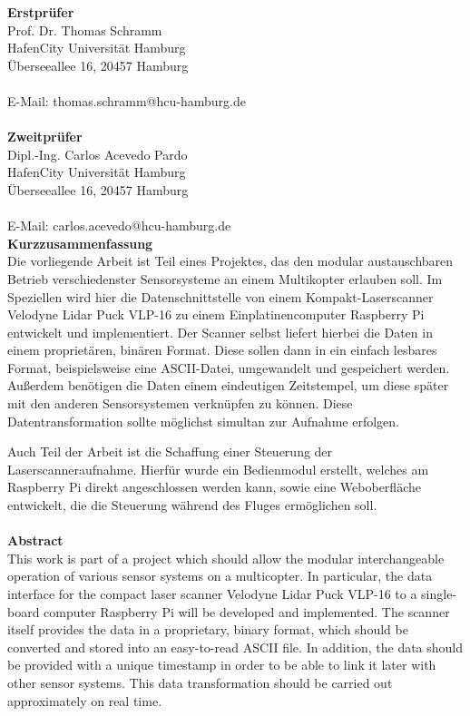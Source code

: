 \documentclass[a4paper,12pt,bibliography=totoc, listof=totoc,titlepage,pointlessnumbers]{scrreprt}
\begin{document}
\noindent\textbf{\large Erstprüfer}\\
Prof. Dr. Thomas Schramm\\
HafenCity Universität Hamburg\\
Überseeallee 16, 20457 Hamburg\\
\\
E-Mail: thomas.schramm@hcu-hamburg.de\\
\vspace{3cm}\\
\textbf{\large Zweitprüfer}\\
Dipl.-Ing. Carlos Acevedo Pardo\\
HafenCity Universität Hamburg\\
Überseeallee 16, 20457 Hamburg\\
\\
E-Mail: carlos.acevedo@hcu-hamburg.de\\
\newpage
\noindent\textbf{\large Kurzzusammenfassung}\\
Die vorliegende Arbeit ist Teil eines Projektes, das den modular austauschbaren Betrieb verschiedenster Sensorsysteme an einem Multikopter erlauben soll. Im Speziellen wird hier die Datenschnittstelle von einem Kompakt-Laser\-scan\-ner Velodyne Lidar Puck VLP-16 zu einem Einplatinencomputer Rasp\-berry Pi entwickelt und implementiert. Der Scanner selbst liefert hierbei die Daten in einem proprietären, binären Format. Diese sollen dann in ein einfach lesbares Format, beispielsweise eine ASCII-Datei, umgewandelt und gespeichert werden. Außerdem benötigen die Daten einem eindeutigen Zeitstempel, um diese später mit den anderen Sensorsystemen verknüpfen zu können. Diese Datentransformation sollte möglichst simultan zur Aufnahme erfolgen.

Auch Teil der Arbeit ist die Schaffung einer Steuerung der Laser\-scan\-ner\-auf\-nahme. Hierfür wurde ein Bedienmodul erstellt, welches am Rasp\-berry Pi direkt angeschlossen werden kann, sowie eine Weboberfläche entwickelt, die die Steuerung während des Fluges ermöglichen soll.\\
\vspace{2cm}\\
\noindent\textbf{\large Abstract}\\
This work is part of a project which should allow the modular interchangeable operation of various sensor systems on a multicopter. In particular, the data interface for the compact laser scanner Velodyne Lidar Puck VLP-16 to a single-board computer Rasp\-berry Pi will be developed and implemented. The scanner itself provides the data in a proprietary, binary format, which should be converted and stored into an easy-to-read ASCII file. In addition, the data should be provided with a unique timestamp in order to be able to link it later with other sensor systems. This data transformation should be carried out approximately on real time.
\end{document}
